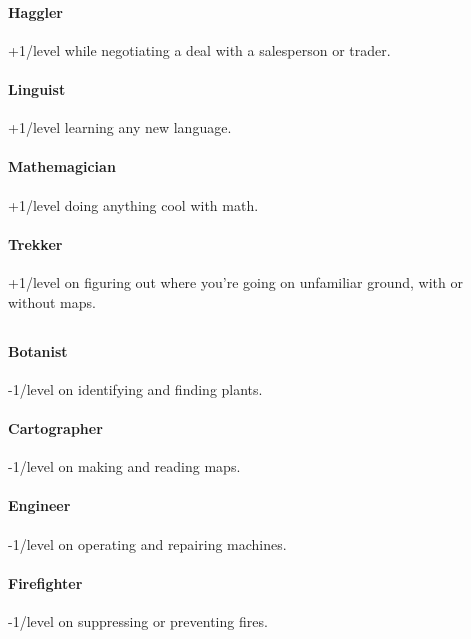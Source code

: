 \paragraph{Haggler}
\hypertarget{SkillHaggler}{}
+1/level while negotiating a deal with a salesperson or trader.

\paragraph{Linguist}
\hypertarget{SkillLinguist}{}
+1/level learning any new language.

\paragraph{Mathemagician}
\hypertarget{SkillMathemagician}{}
+1/level doing anything cool with math.

\paragraph{Trekker}
\hypertarget{SkillTrekker}{}
+1/level on figuring out where you're going on unfamiliar ground, with or without maps.

\subsection{\lasersC}
\hypertarget{skillsLasers}{}

\paragraph{Botanist}
\hypertarget{SkillBotanist}{}
-1/level on identifying and finding plants.

\paragraph{Cartographer}
\hypertarget{SkillCartographer}{}
-1/level on making and reading maps.

\paragraph{Engineer}
\hypertarget{SkillEngineer}{}
-1/level on operating and repairing machines.

\paragraph{Firefighter}
\hypertarget{SkillFirefighter}{}
-1/level on suppressing or preventing fires.

